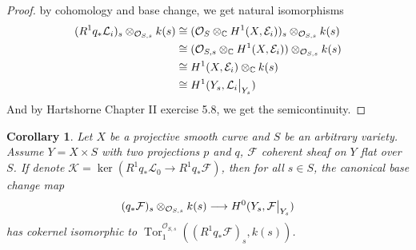 \documentclass{ctexart}
\newtheorem{corollary}{Corollary}[section]
\newcommand{\tor}{\operatorname{Tor}}
\begin{document}
\begin{proof}
    by cohomology and base change, we get natural isomorphisms
    \begin{equation}
        \begin{split}
            (R^{1}q_{\ast}\mathcal{L}_{i})_{s} \otimes_{\mathcal{O}_{S, s}} k(s) & \cong (\mathcal{O}_{S} \otimes_{\mathbb{C}} H^{1}(X, \mathcal{E}_{i}))_{s} \otimes_{\mathcal{O}_{S, s}} k(s) \\
            & \cong (\mathcal{O}_{S, s} \otimes_{\mathbb{C}} H^{1}(X, \mathcal{E}_{i})) \otimes_{\mathcal{O}_{S, s}} k(s) \\
            & \cong H^{1}(X, \mathcal{E}_{i}) \otimes_{\mathbb{C}} k(s) \\
            & \cong H^{1}(Y_{s}, \mathcal{L}_{i}\big{|}_{Y_{s}})
        \end{split}
    \end{equation}
    And by Hartshorne Chapter II exercise 5.8, we get the semicontinuity.
\end{proof}
\begin{corollary}
    Let $X$ be a projective smooth curve and $S$ be an arbitrary variety.
    Assume $Y = X \times S$ with two projections $p$ and $q$, $\mathcal{F}$ coherent sheaf on $Y$ flat over $S$.
    If denote $\mathcal{K} = \ker (R^{1}q_{\ast}\mathcal{L}_{0} \rightarrow R^{1}q_{\ast}\mathcal{F})$,
    then for all $s\in S$, the canonical base change map
    \begin{equation}
        (q_{\ast}\mathcal{F})_{s} \otimes_{\mathcal{O}_{S, s}} k(s) \longrightarrow H^{0}(Y_{s}, \mathcal{F}\big{|}_{Y_{s}})
    \end{equation}
    has cokernel isomorphic to $\tor_{1}^{\mathcal{O}_{S, s}}((R^{1}q_{\ast}\mathcal{F})_{s}, k(s))$.
    \label{Corollary 7.3}
\end{corollary}
\end{document}
